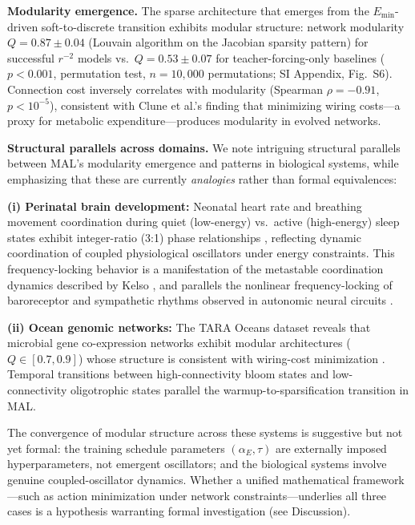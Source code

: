 \documentclass[9pt,twocolumn,twoside]{pnas-new}
\begin{document}
\textbf{Modularity emergence.} The sparse architecture that emerges from the $E_{\mathrm{min}}$-driven soft-to-discrete transition exhibits modular structure: network modularity $Q = 0.87 \pm 0.04$ (Louvain algorithm on the Jacobian sparsity pattern) for successful $r^{-2}$ models vs.\ $Q = 0.53 \pm 0.07$ for teacher-forcing-only baselines ($p < 0.001$, permutation test, $n=10{,}000$ permutations; SI Appendix, Fig.~S6). Connection cost inversely correlates with modularity (Spearman $\rho = -0.91$, $p < 10^{-5}$), consistent with Clune et al.'s \cite{Clune2013} finding that minimizing wiring costs---a proxy for metabolic expenditure---produces modularity in evolved networks.

\textbf{Structural parallels across domains.} We note intriguing structural parallels between MAL's modularity emergence and patterns in biological systems, while emphasizing that these are currently \textit{analogies} rather than formal equivalences:

\textbf{(i) Perinatal brain development:} Neonatal heart rate and breathing movement coordination during quiet (low-energy) vs.\ active (high-energy) sleep states exhibit integer-ratio (3:1) phase relationships \cite{Hoyer2001, Schmidt2014}, reflecting dynamic coordination of coupled physiological oscillators under energy constraints. This frequency-locking behavior is a manifestation of the metastable coordination dynamics described by Kelso \cite{Kelso1995, Tognoli2014, Kelso2021}, and parallels the nonlinear frequency-locking of baroreceptor and sympathetic rhythms observed in autonomic neural circuits \cite{Gebber1997}.

\textbf{(ii) Ocean genomic networks:} The TARA Oceans dataset \cite{Sunagawa2015} reveals that microbial gene co-expression networks exhibit modular architectures ($Q \in [0.7, 0.9]$) whose structure is consistent with wiring-cost minimization \cite{Clune2013}. Temporal transitions between high-connectivity bloom states and low-connectivity oligotrophic states parallel the warmup-to-sparsification transition in MAL.

The convergence of modular structure across these systems is suggestive but not yet formal: the training schedule parameters $(\alpha_E, \tau)$ are externally imposed hyperparameters, not emergent oscillators; and the biological systems involve genuine coupled-oscillator dynamics. Whether a unified mathematical framework---such as action minimization under network constraints---underlies all three cases is a hypothesis warranting formal investigation (see Discussion).
\end{document}
